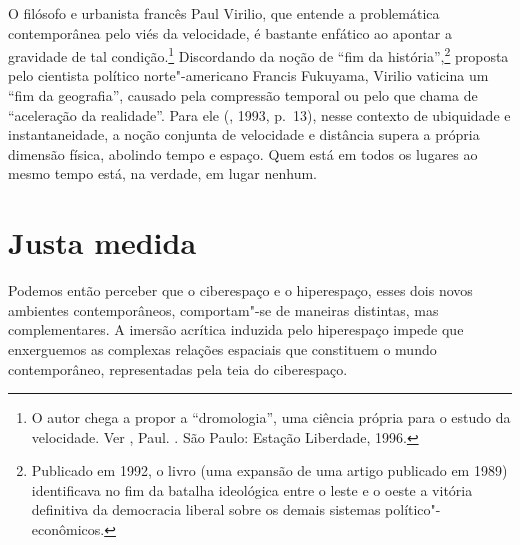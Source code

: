 O filósofo e urbanista francês Paul Virilio, que entende a problemática
contemporânea pelo viés da velocidade, é bastante enfático ao apontar a
gravidade de tal condição.\footnote{O autor chega a propor a
  ``dromologia'', uma ciência própria para o estudo da velocidade. Ver
  , Paul. {}. São Paulo: Estação
  Liberdade, 1996.} Discordando da noção de ``fim da
história'',\footnote{Publicado em 1992, o livro {} (uma expansão de uma artigo publicado em 1989)
  identificava no fim da batalha ideológica entre o leste e o oeste a
  vitória definitiva da democracia liberal sobre os demais sistemas
  político"-econômicos.} proposta pelo cientista político norte"-americano
Francis Fukuyama, Virilio vaticina um ``fim da geografia'', causado pela
compressão temporal ou pelo que chama de ``aceleração da realidade''.
Para ele (, 1993, p.~13), nesse contexto de ubiquidade e
instantaneidade, a noção conjunta de velocidade e distância supera a
própria dimensão física, abolindo tempo e espaço. Quem está em todos os lugares ao mesmo tempo está, na verdade, em lugar nenhum.

\chapter{Justa medida}

Podemos então perceber que o ciberespaço e o hiperespaço, esses dois
novos ambientes contemporâneos, comportam"-se de maneiras distintas, mas
complementares. A imersão acrítica induzida pelo hiperespaço impede que
enxerguemos as complexas relações espaciais que constituem o mundo
contemporâneo, representadas pela teia do ciberespaço.

